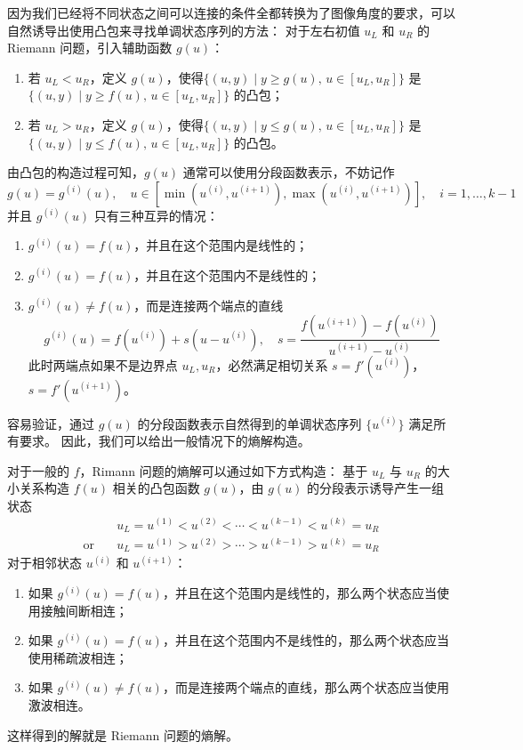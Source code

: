 因为我们已经将不同状态之间可以连接的条件全都转换为了图像角度的要求，可以自然诱导出使用凸包来寻找单调状态序列的方法：
对于左右初值 $u_L$ 和 $u_R$ 的 Riemann 问题，引入辅助函数 $g(u)$：
\begin{enumerate}
    \item 若 $u_L < u_R$，定义 $g(u)$，使得$\{ (u,y) \mid y \ge g(u),\, u \in [u_L,u_R]\}$ 是 $\{ (u,y) \mid y \ge f(u),\, u \in [u_L,u_R]\}$ 的凸包；
    \item 若 $u_L > u_R$，定义 $g(u)$，使得$\{ (u,y) \mid y \le g(u),\, u \in [u_L,u_R]\}$ 是 $\{ (u,y) \mid y \le f(u),\, u \in [u_L,u_R]\}$ 的凸包。
\end{enumerate}
由凸包的构造过程可知，$g(u)$ 通常可以使用分段函数表示，不妨记作
\[
    g(u) = g^{(i)}(u), \quad u \in [\min(u^{(i)},u^{(i+1)}),\max(u^{(i)},u^{(i+1)})],\quad i=1,\dots,k-1
\]
并且 $g^{(i)}(u)$ 只有三种互异的情况：
\begin{enumerate}
    \item $g^{(i)}(u) = f(u)$，并且在这个范围内是线性的；
    \item $g^{(i)}(u) = f(u)$，并且在这个范围内不是线性的；
    \item $g^{(i)}(u) \neq f(u)$，而是连接两个端点的直线
          \[
              g^{(i)}(u) = f(u^{(i)}) + s(u - u^{(i)}),\quad s = \frac{f(u^{(i+1)})-f(u^{(i)})}{u^{(i+1)} - u^{(i)}}
          \]
          此时两端点如果不是边界点 $u_L,u_R$，必然满足相切关系 $s = f'(u^{(i)})$，$s = f'(u^{(i+1)})$。
\end{enumerate}
容易验证，通过 $g(u)$ 的分段函数表示自然得到的单调状态序列 $\{u^{(i)}\}$ 满足所有要求。
因此，我们可以给出一般情况下的熵解构造。
\begin{theorem}
    对于一般的 $f$，Rimann 问题的熵解可以通过如下方式构造：
    基于 $u_L$ 与 $u_R$ 的大小关系构造 $f(u)$ 相关的凸包函数 $g(u)$，由 $g(u)$ 的分段表示诱导产生一组状态
    \begin{align*}
                       & u_L = u^{(1)} < u^{(2)} < \cdots < u^{(k-1)} < u^{(k)} = u_R \\
        \text{or}\quad & u_L = u^{(1)} > u^{(2)} > \cdots > u^{(k-1)} > u^{(k)} = u_R
    \end{align*}
    对于相邻状态 $u^{(i)}$ 和 $u^{(i+1)}$：
    \begin{enumerate}
        \item 如果 $g^{(i)}(u) = f(u)$，并且在这个范围内是线性的，那么两个状态应当使用接触间断相连；
        \item 如果 $g^{(i)}(u) = f(u)$，并且在这个范围内不是线性的，那么两个状态应当使用稀疏波相连；
        \item 如果 $g^{(i)}(u) \neq f(u)$，而是连接两个端点的直线，那么两个状态应当使用激波相连。
    \end{enumerate}
    这样得到的解就是 Riemann 问题的熵解。

\end{theorem}

